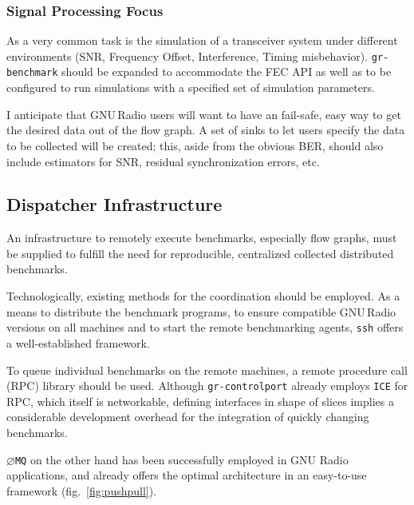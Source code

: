 \documentclass[a4paper]{IEEEtran}
\newcommand{\gr}{GNU\,Radio\xspace}
\newcommand{\grbench}{\texttt{gr-benchmark}\xspace}
\newcommand{\zeromq}{\texttt{$\varnothing$MQ}\xspace}
\begin{document}
\subsubsection*{Signal Processing Focus} As a very common task is the simulation
of a transceiver system under different environments (SNR, Frequency Offset,
Interference, Timing misbehavior). \grbench should be
expanded to accommodate the FEC API as well as to be configured to run
simulations with a specified set of simulation parameters. 

I anticipate that \gr users will want to have an fail-safe, easy way to get the
desired data out of the flow graph.  A set of sinks to let users specify the
data to be collected will be created; this, aside from the obvious BER, should also
include estimators for SNR, residual synchronization errors, etc.

\subsection{Dispatcher Infrastructure}

An infrastructure to remotely execute benchmarks, especially flow graphs, must
be supplied to fulfill the need for reproducible, centralized collected
distributed benchmarks.

Technologically, existing methods for the coordination should be employed.  As
a means to distribute the benchmark programs, to ensure compatible \gr versions
on all machines and to start the remote benchmarking agents, \texttt{ssh}
offers a well-established framework.

To queue individual benchmarks on the remote machines, a remote procedure call
(RPC) library should be used. Although \texttt{gr-controlport} already employs
\texttt{ICE} for RPC, which itself is networkable, defining interfaces in shape
of slices implies a considerable development overhead for the integration of
quickly changing benchmarks.

\zeromq\cite{zeromq} on the other hand has been successfully employed in GNU
Radio applications\cite{airmodes}, and already offers the optimal architecture
in an easy-to-use framework (fig.~\ref{fig:pushpull}).
\end{document}
